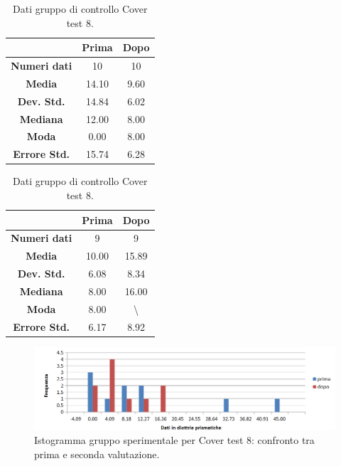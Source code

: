 \begin{table}
\centering
\setlength\tabcolsep{4pt}
\begin{minipage}{0.48\textwidth}
\centering


\begin{tabular}{|c|c|c|} \hline
{\textbf{}} & {\textbf{  \hspace{8pt}Prima\hspace{8pt} }} & {\textbf{ \hspace{8pt}Dopo\hspace{8pt}  }}\\ \hline
\textbf{Numeri dati} & 10 & 10 \\ 
\textbf{Media} & 14.10 & 9.60 \\  
\textbf{Dev. Std.} & 14.84 & 6.02 \\  
\textbf{Mediana} & 12.00 & 8.00 \\ 
\textbf{Moda} & 0.00 & 8.00 \\ 
\textbf{Errore Std.} & 15.74 & 6.28 \\ 
\hline
\end{tabular}
\caption{Dati gruppo sperimentale Cover test 8.}

\label{tab:accuracy} 
\end{minipage}%
\hfill
\begin{minipage}{0.48\textwidth}
\centering

\begin{tabular}{|c|c|c|} \hline
{\textbf{}} & {\textbf{  \hspace{8pt}Prima\hspace{8pt} }} & {\textbf{ \hspace{8pt}Dopo\hspace{8pt}  }}\\ \hline
\textbf{Numeri dati} & 9 & 9 \\ 
\textbf{Media} & 10.00 & 15.89 \\  
\textbf{Dev. Std.} & 6.08 & 8.34 \\  
\textbf{Mediana} & 8.00 & 16.00 \\  
\textbf{Moda} & 8.00 & \textbackslash \\
\textbf{Errore Std.} & 6.17 & 8.92 \\
\hline
\end{tabular}
\caption{Dati gruppo di controllo Cover test 8.}

 \label{tab:ompdiff} 
\end{minipage}
\end{table}
 \begin{figure}[h!]
	\centering
	\includegraphics[scale=0.38]{source/grafici/cover_test_8_trattati_nuovo.png}
	\caption[Istogramma gruppo sperimentale per Cover test 8]{Istogramma gruppo sperimentale per Cover test 8: confronto tra prima e seconda valutazione.}
	\label{fig:issuexample}
\end{figure}
